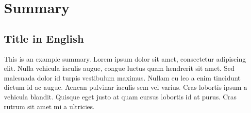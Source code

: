 \section*{Summary}
\subsection*{Title in English}
This is an example summary. Lorem ipsum dolor sit amet, consectetur adipiscing elit. Nulla vehicula iaculis augue, congue luctus quam hendrerit sit amet. Sed malesuada dolor id turpis vestibulum maximus. Nullam eu leo a enim tincidunt dictum id ac augue. Aenean pulvinar iaculis sem vel varius. Cras lobortis ipsum a vehicula blandit. Quisque eget justo at quam cursus lobortis id at purus. Cras rutrum sit amet mi a ultricies.